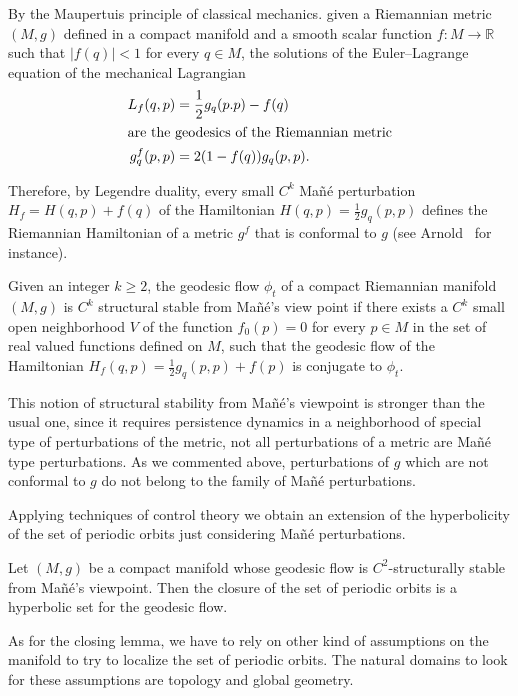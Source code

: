 \documentclass[AHL,Unicode,longabstracts,published]{cedram}
\newcommand{\bbR}{\mathbb{R}}
\begin{document}
By the Maupertuis principle of classical mechanics. given a Riemannian metric $(M,g)$ defined in a compact manifold and a smooth scalar function $f : M \longrightarrow \bbR$ such that $\mid f(q) \mid <1$ for every $ q \in M$, the solutions of the Euler--Lagrange equation of the mechanical Lagrangian
\begin{align*}
L_{f}(q,p) &= \frac{1}{2}g_{q}(p.p) - f(q)
\\
\intertext{are the geodesics of the Riemannian metric}
g^{f}_{q}(p,p)&= 2(1- f(q))g_{q}(p,p).
\end{align*}

Therefore, by Legendre duality, every small $C^{k}$ Mañé perturbation $H_{f}=H(q,p) + f(q)$ of the Hamiltonian $H(q,p) = \frac{1}{2}g_{q}(p,p)$ defines the Riemannian Hamiltonian of a metric $g^{f}$ that is conformal to $g$ (see Arnold~\cite{kn:Arnold} for instance).

\begin{defi}\label{stability}
Given an integer $k\geq 2$, the geodesic flow $\phi_{t}$ of a compact Riemannian manifold $(M,g)$ is $C^{k}$ structural stable from Mañé's view point if there exists a $C^{k}$ small open neighborhood $V$ of the function $f_{0}(p) = 0$ for every $ p \in M$ in the set of real valued functions defined on $M$, such that the geodesic flow of the Hamiltonian $H_{f}(q,p) = \frac{1}{2}g_{q}(p,p) + f(p)$ is conjugate to $\phi_{t}$.
\end{defi}

This notion of structural stability from Mañé's viewpoint is stronger than the usual one, since it requires persistence dynamics in a neighborhood of special type of perturbations of the metric, not all perturbations of a metric are Mañé type perturbations. As we commented above, perturbations of $g$ which are not conformal to $g$ do not belong to the family of Mañé perturbations.

Applying techniques of control theory we obtain an extension of the hyperbolicity of the set of periodic orbits just considering Mañé perturbations.

\begin{theo}\label{persistence}
Let $(M,g)$ be a compact manifold whose geodesic flow is $C^{2}$-structurally stable from Mañé's viewpoint. Then the closure of the set of periodic orbits is a hyperbolic set for the geodesic flow.
\end{theo}

As for the closing lemma, we have to rely on other kind of assumptions on the manifold to try to localize the set of periodic orbits. The natural domains to look for these assumptions are topology and global geometry.
\end{document}
